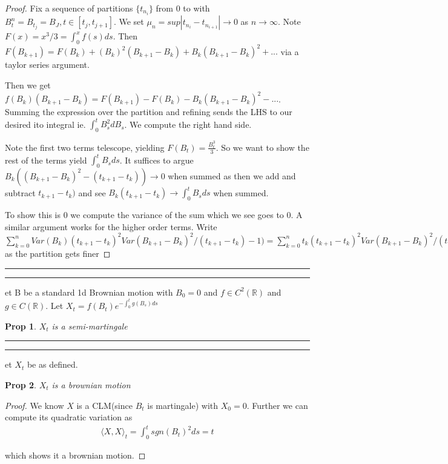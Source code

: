 \documentclass[11pt]{article}
\newcommand{\R}{\mathbb{R}}
\newcommand{\question}[2] {\vspace{.25in} \hrule\vspace{0.5em}
\noindent{\bf #1: #2} \vspace{0.5em}
\hrule \vspace{.10in}}
\newtheorem{prop}{Prop}
\begin{document}
\begin{proof}
	Fix a sequence of partitions $\{t_{n_i}\}$ from 0 to with $B_t^n = B_{t_j} = B_J, t \in [t_j,t_{j+1}]$. We set $\mu_n = sup|t_{n_i} - t_{n_{i+1}}| \to 0$ as $n \to \infty$. Note $F(x) = x^3/3 = \int_0^xf(s)ds$. Then $F(B_{k+1}) = F(B_k) + (B_k)^2(B_{k+1} - B_k) + B_k(B_{k+1} - B_k)^2 + ...$ via a taylor series argument. 

	Then we get $f(B_k)(B_{k+1}- B_k) = F(B_{k+1}) - F(B_k) - B_k(B_{k+1}-B_k)^2 -...$. Summing the expression over the partition and refining sends the LHS to our desired ito integral ie. $\int_0^t B_s^2 dB_s$. We compute the right hand side. 

	Note the first two terms telescope, yielding $F(B_t) = \frac{B_t^3}{3}$. So we want to show the rest of the terms yield $\int_0^t B_s ds$. It suffices to argue $B_k((B_{k+1} - B_k)^2 - (t_{k+1}-t_k)) \to 0$ when summed as then we add and subtract $t_{k+1}-t_k)$ and see $B_k(t_{k+1} -t_k) \to \int_0^t B_sds$ when summed. 

	To show this is 0 we compute the variance of the sum which we see goes to 0. A similar argument works for the higher order terms. Write $\sum_{k=0}^n Var(B_k)(t_{k+1}-t_k)^2 Var(B_{k+1}-B_k)^2/(t_{k+1}-t_k) - 1) = \sum_{k=0}^n t_k(t_{k+1}-t_k)^2 Var(B_{k+1}-B_k)^2/(t_{k+1}-t_k) - 1) \to 0$ as the partition gets finer

\end{proof}

\question{Question 29}

Let B be a standard 1d Brownian motion with $B_0 = 0$ and $f \in C^2(\R)$ and $g \in C(\R)$. Let $X_t = f(B_t) e^{-\int_0^t g(B_s)ds}$

\begin{prop}
	$X_t$ is a semi-martingale
\end{prop}

\question{Question 30}

Let $X_t$ be as defined.

\begin{prop}
	$X_t$ is a brownian motion
\end{prop}

\begin{proof}
	We know $X$ is a CLM(since $B_t$ is martingale) with $X_0 = 0$. Further we can compute its quadratic variation as 
	\begin{align*}
		\langle X, X\rangle_t = \int_0^t sgn(B_t)^2ds = t
	\end{align*}

	which shows it a brownian motion. 
\end{proof}
\end{document}
